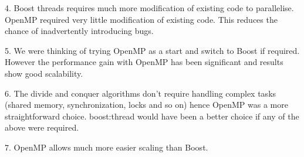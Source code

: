 4. Boost threads requires much more modification of existing code to parallelise. OpenMP required very little modification of existing code. This reduces the chance of inadvertently introducing bugs.

5. We were thinking of trying OpenMP as a start and switch to Boost if required. However the performance gain with OpenMP has been significant and results show good scalability.

6. The divide and conquer algorithms don't require handling complex tasks (shared memory, synchronization, locks and so on) hence OpenMP was a more straightforward choice. boost:thread would have been a better choice if any of the above were required.

7. OpenMP allows much more easier scaling than Boost.
